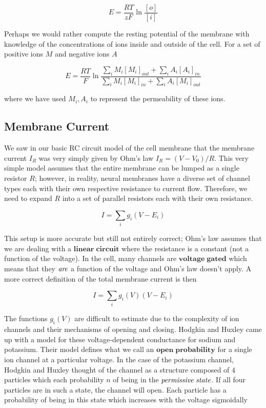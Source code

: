 \documentclass[a4paper,11pt]{book}
\begin{document}
\begin{equation*}
E = \frac{RT}{zF}\ln \frac{[o]}{[i]}
\end{equation*}

Perhaps we would rather compute the resting potential of the membrane with knowledge of the concentrations of ions inside and outside of the cell. For a set of positive ions $M$ and negative ions $A$

\begin{equation*}
E = \frac{RT}{F}\ln \frac{\sum_{i} M_{i}[M_{i}]_{out} + \sum_{i} A_{i}[A_{i}]_{in}}{\sum_{i} M_{i}[M_{i}]_{in} +\sum_{i} A_{i}[M_{i}]_{out}}
\end{equation*}

where we have used $M_{i}, A_{i}$ to represent the permeability of these ions.

\subsection{Membrane Current}

We saw in our basic RC circuit model of the cell membrane that the membrane current $I_{R}$ was very simply given by Ohm's law $I_{R} = (V-V_{0})/R$. This very simple model assumes that the entire membrane can be lumped as a single resistor $R$; however, in reality, neural membranes have a diverse set of channel types each with their own respective resistance to current flow. Therefore, we need to expand $R$ into a set of parallel resistors each with their own resistance.

\begin{equation*}
I = \sum_{i} g_{i}(V-E_{i})
\end{equation*}

This setup is more accurate but still not entirely correct; Ohm's law assumes that we are dealing with a $\mathbf{linear \; circuit}$ where the resistance is a constant (not a function of the voltage). In the cell, many channels are $\mathbf{voltage \; gated}$ which means that they $\it{are}$ a function of the voltage and Ohm's law doesn't apply. A more correct definition of the total membrane current is then

\begin{equation}
I = \sum_{i} g_{i}(V)(V-E_{i})
\end{equation}

The functions $g_{i}(V)$ are difficult to estimate due to the complexity of ion channels and their mechanisms of opening and closing. Hodgkin and Huxley came up with a model for these voltage-dependent conductance for sodium and potassium. Their model defines what we call an $\mathbf{open \; probability}$ for a single ion channel at a particular voltage. In the case of the potassium channel, Hodgkin and Huxley thought of the channel as a structure composed of 4 particles which each probability $n$ of being in the $\it{permissive\; state}$. If all four particles are in such a state, the channel will open. Each particle has a probability of being in this state which increases with the voltage sigmoidally
\end{document}
